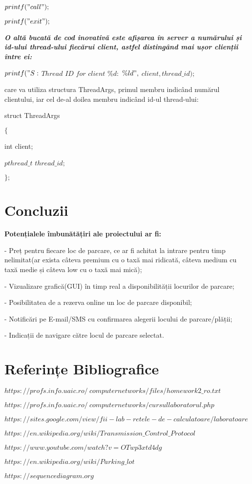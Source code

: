 \documentclass{article}
\begin{document}
$printf("call");$

$printf("exit");$

\textit{\textbf{O altă bucată de cod inovativă este afișarea în server a numărului și id-ului thread-ului fiecărui client, astfel distingând mai ușor clienții între ei:}}

$printf("S:$ $Thread$ $ID$ $for$ $client$ $\%d:$ $\%ld",$ $client, thread\_id);$

care va utiliza structura ThreadArgs, primul membru indicând numărul clientului, iar cel de-al doilea membru indicând id-ul thread-ului:

struct ThreadArgs

    $\{$
    
        int client;
        
        $pthread\_t$ $thread\_id;$
        
    $\};$

\section{Concluzii}
\textbf{Potențialele îmbunătățiri ale proiectului ar fi:}

- Preț pentru fiecare loc de parcare, ce ar fi achitat la intrare pentru timp nelimitat(ar exista câteva premium cu o taxă mai ridicată, câteva medium cu taxă medie și câteva low cu o taxă mai mică);

- Vizualizare grafică(GUI) în timp real a disponibilității locurilor de parcare;

- Posibilitatea de a rezerva online un loc de parcare disponibil;

- Notificări pe E-mail/SMS cu confirmarea alegerii locului de parcare/plății;

- Indicații de navigare către locul de parcare selectat.

\section{Referințe Bibliografice}
$https://profs.info.uaic.ro/~computernetworks/files/homework2\_ro.txt$

$https://profs.info.uaic.ro/~computernetworks/cursullaboratorul.php$

$https://sites.google.com/view/fii-lab-retele-de-calculatoare/laboratoare$

$https://en.wikipedia.org/wiki/Transmission\_Control\_Protocol$

$https://www.youtube.com/watch?v=OTwp3xtd4dg$

$https://en.wikipedia.org/wiki/Parking\_lot$

$https://sequencediagram.org$
\end{document}
